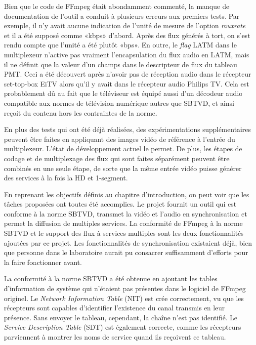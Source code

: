 \documentclass[12pt,a4paper]{article}
\begin{document}
Bien que le code de FFmpeg était abondamment commenté, la manque de documentation de l'outil a conduit à plusieurs erreurs aux premiers tests. Par exemple, il n'y avait aucune indication de l'unité de mesure de l'option \textit{muxrate} et il a été supposé comme «kbps» d'abord. Après des flux générés à tort, on s'est rendu compte que l'unité a été plutôt «bps». En outre, le \textit{flag} LATM dans le multiplexeur n'active pas vraiment l'encapsulation du flux audio en LATM, mais il ne définit que la valeur d'un champs dans le descripteur de flux du tableau PMT. Ceci a été découvert après n'avoir pas de réception audio dans le récepteur set-top-box EiTV alors qu'il y avait dans le récepteur audio Philips TV. Cela est probablement dû au fait que le téléviseur est équipé aussi d'un décodeur audio compatible aux normes de télévision numérique autres que SBTVD, et ainsi reçoit du contenu hors les contraintes de la norme.

En plus des tests qui ont été déjà réalisées, des expérimentations supplémentaires peuvent être faites en appliquant des images vidéo de référence à l'entrée du multiplexeur. L'état de développement actuel le permet. De plus, les étapes de codage et de multiplexage des flux qui sont faites séparément peuvent être combinés en une seule étape, de sorte que la même entrée vidéo puisse générer des services à la fois la HD et 1-segment.

En reprenant les objectifs définis au chapitre d'introduction, on peut voir que les tâches proposées ont toutes été accomplies. Le projet fournit un outil qui est conforme à la norme SBTVD, transmet la vidéo et l'audio en synchronisation et permet la diffusion de multiples services. La conformité de FFmpeg à la norme SBTVD et le support des flux à services multiples sont les deux fonctionnalités ajoutées par ce projet. Les fonctionnalités de synchronisation existaient déjà, bien que personne dans le laboratoire aurait pu consacrer suffisamment d'efforts pour la faire fonctionner avant.

La conformité à la norme SBTVD a été obtenue en ajoutant les tables d'information de système qui n'étaient pas présentes dans le logiciel de FFmpeg originel. Le \textit{Network Information Table} (NIT) est crée correctement, vu que les récepteurs sont capables d'identifier l'existence du canal transmis en leur présence. Sans envoyer le tableau, cependant, la chaîne n'est pas identifié. Le \textit{Service Description Table} (SDT) est également correcte, comme les récepteurs parviennent à montrer les noms de service quand ils reçoivent ce tableau.
\end{document}
